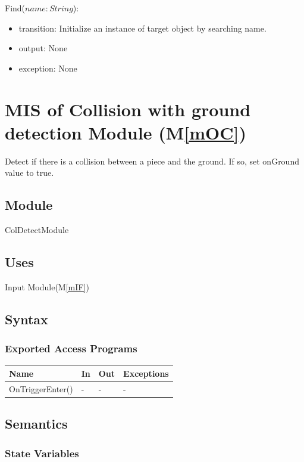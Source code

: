 \documentclass[12pt, titlepage]{article}
\newcommand{\mref}[1]{M\ref{#1}}
\begin{document}
\noindent Find($name: String$):
\begin{itemize}
	\item transition: Initialize an instance of target object by searching name.
	\item output: None
	\item exception: None
\end{itemize}


\section{MIS of Collision with ground detection Module (\mref{mOC})}

Detect if there is a collision between a piece and the ground. If so, set onGround
value to true.

\subsection{Module}

ColDetectModule

\subsection{Uses}

Input Module(\mref{mIF})

\subsection{Syntax}

\subsubsection{Exported Access Programs}

\begin{center}
	\begin{tabular}{p{4cm} p{4cm} p{4cm} p{2cm}}
		\hline
		\textbf{Name} & \textbf{In} & \textbf{Out} & \textbf{Exceptions} \\
		\hline
		OnTriggerEnter() & - & - & - \\
		\hline
	\end{tabular}
\end{center}

\subsection{Semantics}

\subsubsection{State Variables}
\end{document}
